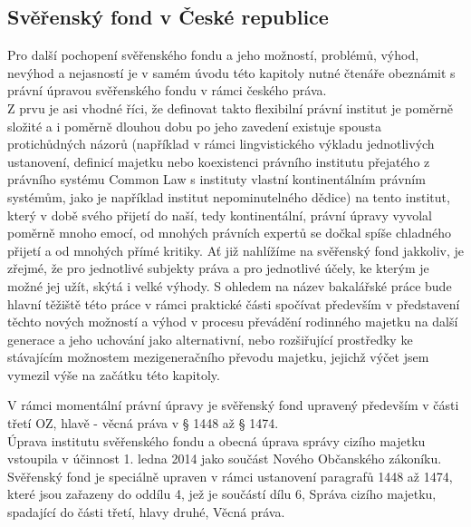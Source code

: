\documentclass{article}
\begin{document}
\newpage

\thispagestyle{smallertextinheader}

\subsection{Svěřenský fond v České republice}

Pro další pochopení svěřenského fondu a jeho možností, problémů, výhod, nevýhod a nejasností je v samém úvodu této kapitoly nutné čtenáře obeznámit s právní úpravou svěřenského fondu v rámci českého práva. \\

Z prvu je asi vhodné říci, že definovat takto flexibilní právní institut je poměrně složité a i poměrně dlouhou dobu po jeho zavedení existuje spousta protichůdných názorů (například v rámci lingvistického výkladu jednotlivých ustanovení, definicí majetku nebo koexistenci právního institutu přejatého z právního systému Common Law s instituty vlastní kontinentálním právním systémům, jako je například institut nepominutelného dědice) na tento institut, který v době svého přijetí do naší, tedy kontinentální, právní úpravy vyvolal poměrně mnoho emocí, od mnohých právních expertů se dočkal spíše chladného přijetí a od mnohých přímé kritiky. Ať již nahlížíme na svěřenský fond jakkoliv, je zřejmé, že pro jednotlivé subjekty práva a pro jednotlivé účely, ke kterým je možné jej užít, skýtá i velké výhody. S ohledem na název bakalářské práce bude hlavní těžiště této práce v rámci praktické části spočívat především v představení těchto nových možností a výhod v procesu převádění rodinného majetku na další generace a jeho uchování jako alternativní, nebo rozšiřující prostředky ke stávajícím možnostem mezigeneračního převodu majetku, jejichž výčet jsem vymezil výše na začátku této kapitoly.


V rámci momentální právní úpravy je svěřenský fond upravený především v části třetí OZ, hlavě \MakeUppercase{{}} - věcná práva v § 1448 až § 1474. \\

Úprava institutu svěřenského fondu a obecná úprava správy cizího majetku vstoupila v účinnost 1. ledna 2014 jako součást Nového Občanského zákoníku. Svěřenský fond je speciálně upraven v rámci ustanovení paragrafů 1448 až 1474, které jsou zařazeny do oddílu 4, jež je součástí dílu 6, Správa cizího majetku, spadající do části třetí, hlavy druhé, Věcná práva. \\
\end{document}
